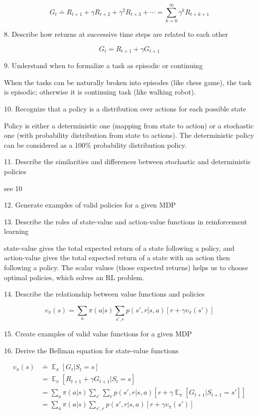 \documentclass[lang=en,mode=geye,device=normal,color=blue,14pt]{elegantnote}
\DeclareMathOperator*{\E}{\mathbb{E}}
\DeclareMathOperator*{\1}{\mathbbm{1}}
\begin{document}
$$ G_t \doteq R_{t+1} + \gamma R_{t+2} + \gamma^2 R_{t+3} + \cdots = \sum_{k=0}^{\infty} \gamma^k R_{t+k+1} $$

8. Describe how returns at successive time steps are related to each other

$$ G_t = R_{t+1} + \gamma G_{t+1} $$

9. Understand when to formalize a task as episodic or continuing

When the tasks can be naturally broken into episodes (like chess game), the task is episodic; otherwise it is continuing task (like walking robot).

10. Recognize that a policy is a distribution over actions for each possible state

Policy is either a deterministic one (mapping from state to action) or a stochastic one (with probability distribution from state to actions).
The deterministic policy can be considered as a 100\% probability distribution policy.

11. Describe the similarities and differences between stochastic and deterministic policies

see 10

12. Generate examples of valid policies for a given MDP

13. Describe the roles of state-value and action-value functions in reinforcement learning

state-value gives the total expected return of a state following a policy, and action-value gives the total expected return of a state with an action then following a policy.
The scalar values (those expected returns) helps us to choose optimal policies, which solves an RL problem.

14. Describe the relationship between value functions and policies

$$v_\pi (s) = \sum_a \pi (a|s) \sum_{s',r} p(s',r|s,a)[r+\gamma v_\pi(s')] $$

15. Create examples of valid value functions for a given MDP

16. Derive the Bellman equation for state-value functions

\begin{align*}
v_\pi(s) & \doteq \E_\pi[G_t | S_t = s]\\
& = \E_\pi[R_{t+1} + \gamma G_{t+1} | S_t = s]\\
& = \sum_a \pi(a|s) \sum_{s'}\sum_r p(s',r|s,a) [r+ \gamma \E_\pi[G_{t+1} | S_{t+1}=s']]\\
& = \sum_a \pi(a|s) \sum_{s',r} p(s',r|s,a) [r+ \gamma v_\pi(s')]
\end{align*}
\end{document}
